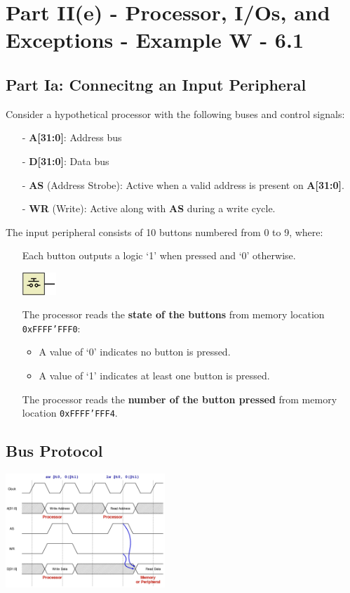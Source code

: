 \chapter{Part II(e) - Processor, I/Os, and Exceptions - Example W - 6.1}
\section{Part Ia: Connecitng an Input Peripheral}
Consider a hypothetical processor with the following buses and control signals:
\begin{itemize}
    \item[-] \textbf{A[31:0]}: Address bus
    \item[-] \textbf{D[31:0]}: Data bus
    \item[-] \textbf{AS} (Address Strobe): Active when a valid address is present on \textbf{A[31:0]}.
    \item[-] \textbf{WR} (Write): Active along with \textbf{AS} during a write cycle.
\end{itemize}

The input peripheral consists of 10 buttons numbered from 0 to 9, where:
\begin{itemize}
    \item[] Each button outputs a logic ‘1’ when pressed and ‘0’ otherwise.
    \begin{center}
        \includegraphics[width=0.10\textwidth]{chapters/chapter2e/images/button.png}
    \end{center}
    \item[] The processor reads the \textbf{state of the buttons} from memory location \texttt{0xFFFF'FFF0}:
    \begin{itemize}
        \item A value of ‘0’ indicates no button is pressed.
        \item A value of ‘1’ indicates at least one button is pressed.
    \end{itemize}
    \item[] The processor reads the \textbf{number of the button pressed} from memory location \texttt{0xFFFF'FFF4}.
\end{itemize}

\section{Bus Protocol}
 \begin{center}
     \includegraphics[width=0.45\textwidth]{chapters/chapter2e/images/bus.png}
 \end{center}
